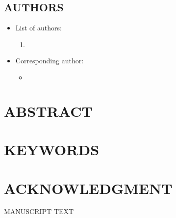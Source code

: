 \documentclass[12pt,english]{article}
\begin{document}
\subsection*{AUTHORS}
\begin{itemize}[label={}, leftmargin=*]
    \item List of authors:
    \begin{enumerate}
        \item \AUTHORWANG
    \end{enumerate}
    \item Corresponding author:
    \begin{itemize}
        \item \textbf{\AUTHORWANGINFO}
    \end{itemize}
\end{itemize}
\clearpage 

\doublespacing
\section*{ABSTRACT}
\PAPERABSTRACT
\clearpage 

\doublespacing
\section*{KEYWORDS}
\PAPERKEYWORDS
\clearpage 

\doublespacing
\section*{ACKNOWLEDGMENT}
\ACKNOWLEDGMENTS
\clearpage 

\setcounter{page}{1}
\renewcommand*{\thefootnote}{\arabic{footnote}}
\begingroup
  \centering
  \Large MANUSCRIPT TEXT\\[1em]
\endgroup


\begingroup
{}
\setlength\bibitemsep{0pt}
\printbibliography[title=References for Manuscript]
\endgroup
\pagebreak


\end{document}
